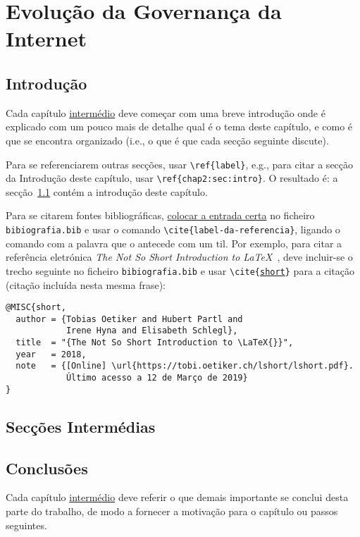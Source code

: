\chapter{Evolução da Governança da Internet}
\label{chap:evolução-da-governança-da-internet}

\section{Introdução}
\label{chap2:sec:intro}
Cada capítulo \underline{intermédio} deve começar com uma breve introdução onde é explicado com um pouco mais de detalhe qual é o tema deste capítulo, e como é que se encontra organizado (i.e., o que é que cada secção seguinte discute). 


Para se referenciarem outras secções, usar \texttt{\textbackslash{}ref\{label\}}, e.g., para citar a secção da Introdução deste capítulo, usar \texttt{\textbackslash{}ref\{chap2:sec:intro\}}. O resultado é: a secção~\ref{chap2:sec:intro} contém a introdução deste capítulo.

Para se citarem fontes bibliográficas, \underline{colocar a entrada certa} no ficheiro \texttt{bibiografia.bib} e usar o comando \texttt{\textbackslash{}cite\{label-da-referencia\}}, ligando o comando com a palavra que o antecede com um til. Por exemplo, para citar a referência eletrónica \emph{The Not So Short Introduction to \LaTeX{}}~\cite{short}, deve incluir-se o trecho seguinte no ficheiro \texttt{bibiografia.bib} e usar \texttt{\textbackslash{}cite\{\underline{short}\}} para a citação (citação incluída nesta mesma frase):
%
\small
\begin{verbatim}
@MISC{short,
  author = {Tobias Oetiker and Hubert Partl and 
            Irene Hyna and Elisabeth Schlegl},
  title  = "{The Not So Short Introduction to \LaTeX{}}",
  year   = 2018,
  note   = {[Online] \url{https://tobi.oetiker.ch/lshort/lshort.pdf}. 
            Último acesso a 12 de Março de 2019}
}
\end{verbatim}
\normalsize


\section{Secções Intermédias}
\label{chap2:sec:...}

\section{Conclusões}
\label{chap2:sec:concs}
Cada capítulo \underline{intermédio} deve referir o que demais importante se conclui desta parte do trabalho, de modo a fornecer a motivação para o capítulo ou passos seguintes.